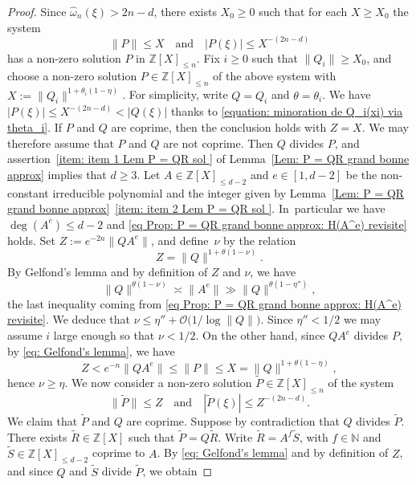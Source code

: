 \documentclass[JEP,XML,SOM,Unicode,NoFloatCountersInSection,published]{cedram}
\newcommand\bN{\mathbb{N}}
\newcommand\bZ{\mathbb{Z}}
\newcommand\tP{\widetilde{P}}
\newcommand\tR{\widetilde{R}}
\newcommand\tS{\widetilde{S}}
\newcommand\GrO{\mathcal{O}}
\newcommand\homega{\widehat{\omega}}\newcommand\HH{\mathcal{H}}
\newcommand{\normH}[1]{\|#1\|}
\newcommand\AND{\quad\text{and}\quad}
\theoremstyle{definition}
\theoremstyle{plain}
\begin{document}
\begin{proof}
Since $\homega_n(\xi) > 2n-d$, there exists $X_0\geq 0$ such that for each $X \geq X_0$ the system
\begin{equation*}
\normH{P} \leq X \AND |P(\xi)| \leq X^{-(2n-d)}
\end{equation*}
has a non-zero solution $P$ in $\bZ[X]_{\leq n}$. Fix $i\geq 0$ such that $\normH{Q_i}\geq X_0$, and choose a non-zero solution $P\in\bZ[X]_{\leq n}$ of the above system with $X := \normH{Q_i}^{1+\theta_i(1-\eta)}$. For simplicity, write $Q= Q_i$ and $\theta = \theta_i$. We have $|P(\xi)|\leq X^{-(2n-d)} < |Q(\xi)|$ thanks to \eqref{equation: minoration de Q_i(xi) via theta_i}. If $P$ and $Q$ are coprime, then the conclusion holds with $Z=X$. We may therefore assume that $P$ and $Q$ are not coprime. Then $Q$ divides $P$, and assertion~\eqref{item: item 1 Lem P = QR sol } of Lemma~\ref{Lem: P = QR grand bonne approx} implies that $d\geq 3$. Let $A\in\bZ[X]_{\leq d-2}$ and $e\in[1,d-2]$ be the non-constant irreducible polynomial and the integer given by Lemma~\ref{Lem: P = QR grand bonne approx}~\eqref{item: item 2 Lem P = QR sol }. In~particular we have $\deg(A^e)\leq d-2$ and \eqref{eq Prop: P = QR grand bonne approx: H(A^e) revisite} holds. Set $Z:= e^{-2n}\normH{QA^{e}}$, and define~$\nu$ by the relation
\[
Z = \normH{Q}^{1+\theta(1-\nu)}.
\]
By Gelfond's lemma and by definition of $Z$ and $\nu$, we have
\begin{equation*}
\normH{Q}^{\theta(1-\nu)} \asymp \normH{A^e} \gg \normH{Q}^{\theta(1-\eta'')},
\end{equation*}
the last inequality coming from \eqref{eq Prop: P = QR grand bonne approx: H(A^e) revisite}. We deduce that $\nu \leq \eta'' + \GrO\big(1/\log \normH{Q}\big)$. Since $\eta'' < 1/2$ we may assume $i$ large enough so that $\nu < 1/2$. On the other hand, since $QA^e$ divides $P$, by \eqref{eq: Gelfond's lemma}, we have
\[
Z < e^{-n}\normH{QA^e} \leq \normH{P} \leq X = \normH{Q}^{1+\theta(1-\eta)},
\]
hence $\nu\geq \eta$. We now consider a non-zero solution $\tP\in\bZ[X]_{\leq n}$ of the system
\begin{equation}
\label{eq proof: system avec Y}
\normH{\tP} \leq Z \AND |\tP(\xi)| \leq Z^{-(2n-d)}.
\end{equation}
We claim that $\tP$ and $Q$ are coprime. Suppose by contradiction that $Q$ divides $\tP$. There exists $\tR\in\bZ[X]$ such that $\tP = Q\tR$. Write $\tR = A^f\tS$, with $f\in\bN$ and $\tS\in\bZ[X]_{\leq d-2}$ coprime to $A$. By \eqref{eq: Gelfond's lemma} and by definition of $Z$, and since $Q$ and $\tS$ divide $\tP$, we obtain

\end{proof}
\end{document}
